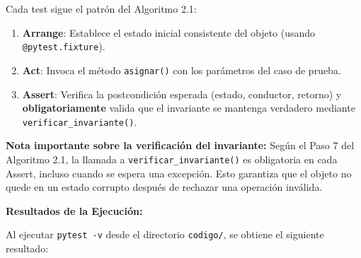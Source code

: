 Cada test sigue el patrón del Algoritmo 2.1:
\begin{enumerate}
    \item \textbf{Arrange}: Establece el estado inicial consistente del objeto (usando \texttt{@pytest.fixture}).
    \item \textbf{Act}: Invoca el método \texttt{asignar()} con los parámetros del caso de prueba.
    \item \textbf{Assert}: Verifica la postcondición esperada (estado, conductor, retorno) y \textbf{obligatoriamente} valida que el invariante se mantenga verdadero mediante \texttt{verificar\_invariante()}.
\end{enumerate}

\textbf{Nota importante sobre la verificación del invariante:} Según el Paso 7 del Algoritmo 2.1, la llamada a \texttt{verificar\_invariante()} es obligatoria en cada Assert, incluso cuando se espera una excepción. Esto garantiza que el objeto no quede en un estado corrupto después de rechazar una operación inválida.

\textbf{Resultados de la Ejecución:}

Al ejecutar \texttt{pytest -v} desde el directorio \texttt{codigo/}, se obtiene el siguiente resultado:

